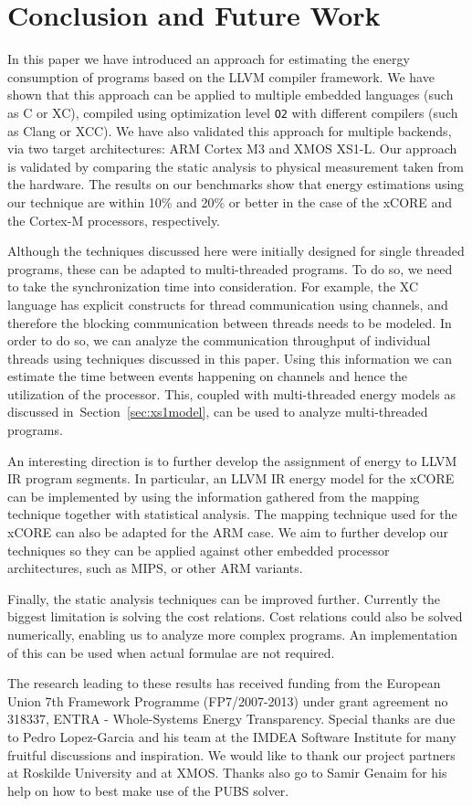 \documentclass[9pt,preprint]{sigplanconf}
\newcommand{\secref}[1]{Section~\ref{sec:#1}}
\begin{document}
\section{Conclusion and Future Work}
\label{sec:conc_future}
In this paper we have introduced an approach for estimating the energy
consumption of programs based on the LLVM compiler framework. We have shown
that this approach can be applied to multiple embedded languages (such as C or
XC), compiled using optimization level \texttt{O2} with different compilers
(such as Clang or XCC). We have also validated this approach for multiple
backends, via two target architectures: ARM Cortex M3 and XMOS XS1-L. Our
approach is validated by comparing the static analysis to physical measurement
taken from the hardware. The results on our benchmarks show that energy
estimations using our technique are within 10\% and 20\% or better in the case
of the xCORE and the Cortex-M processors, respectively.

Although the techniques discussed here were initially designed for single
threaded programs, these can be adapted to multi-threaded programs. To do so,
we need to take the synchronization time into consideration. For
example, the XC language has explicit constructs for thread communication using
channels, and
therefore the blocking communication between threads needs to be modeled. In
order to do so, we can analyze the communication throughput of individual
threads using techniques discussed in this paper. Using this information we can
estimate the time between events happening on channels and hence the utilization
of the processor. This, coupled with multi-threaded energy models as discussed
in~\secref{xs1model}, can be used to analyze multi-threaded programs.

An interesting direction is to further develop the assignment of
energy to LLVM IR program segments. In particular, an LLVM IR energy model for
the xCORE can be implemented by using the information gathered from the mapping
technique together with statistical analysis. The mapping technique used for the xCORE
can also be adapted for the ARM case. We  aim to further develop our
techniques so they can be applied against other embedded
processor architectures, such as MIPS, or other ARM variants.

Finally, the static analysis techniques can be improved further. Currently the biggest
limitation is solving the cost relations. Cost relations could also be
solved numerically, enabling us to analyze more complex programs. An
implementation of this can be used when actual formulae are not
required.

\acks
The research leading to these results has received funding from the European
Union 7th Framework Programme (FP7/2007-2013) under grant agreement no 318337,
ENTRA - Whole-Systems Energy Transparency. Special thanks are due to Pedro
Lopez-Garcia and his team at the IMDEA Software Institute for many fruitful
discussions and inspiration. We would like to thank our project
partners at Roskilde University and at XMOS. Thanks also go to Samir Genaim
for his help on how to best make use of the PUBS solver.



\end{document}
